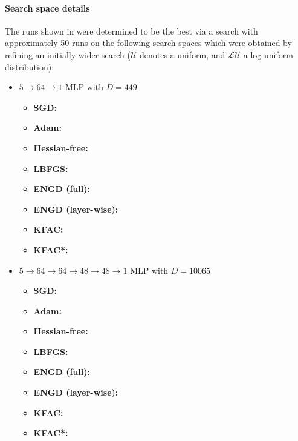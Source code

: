 \paragraph{Search space details} The runs shown in  were determined to be the best via a search with approximately 50 runs on the following search spaces which were obtained by refining an initially wider search ($\mathcal{U}$ denotes a uniform, and $\mathcal{LU}$ a log-uniform distribution):
\begin{itemize}
\item $5\to 64\to 1$ MLP with $D=449$
  \begin{itemize}
    \def\pathToRuns{kfac_pinns_exp/exp10_reproduce_poisson5d/tex}
  \item \textbf{SGD:} 
  \item \textbf{Adam:} 
  \item \textbf{Hessian-free:} 
  \item \textbf{LBFGS:} 
  \item \textbf{ENGD (full):} 
  \item \textbf{ENGD (layer-wise):} 
  \item \textbf{KFAC:} 
  \item \textbf{KFAC*:} 
  \end{itemize}

\item $5 \to 64 \to 64 \to 48 \to 48 \to 1$ MLP with $D=\num{10065}$
  \begin{itemize}
    \def\pathToRuns{kfac_pinns_exp/exp16_poisson5d_deepwide/tex}
  \item \textbf{SGD:} 
  \item \textbf{Adam:} 
  \item \textbf{Hessian-free:} 
  \item \textbf{LBFGS:} 
  \item \textbf{ENGD (full):} 
  \item \textbf{ENGD (layer-wise):} 
  \item \textbf{KFAC:} 
  \item \textbf{KFAC*:} 
  \end{itemize}


\end{itemize}
